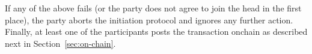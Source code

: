 If any of the above fails (or the party does not agree to join the head in the
first place), the party aborts the initiation protocol and ignores any further
action. Finally, at least one of the participants posts the \mtxInit{} transaction
onchain as described next in Section~\ref{sec:on-chain}.

